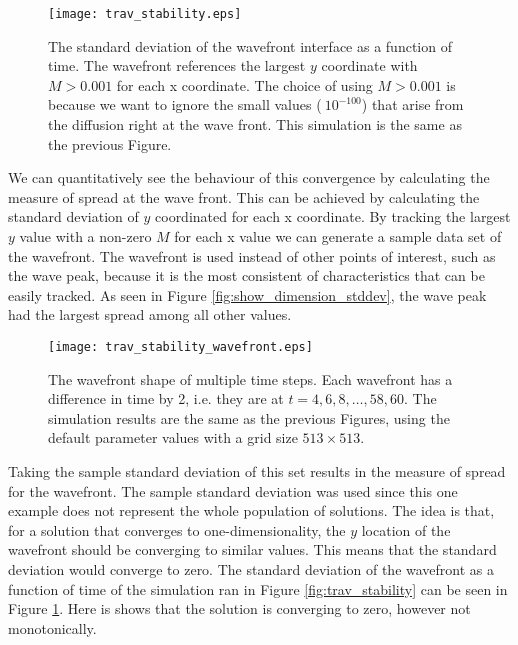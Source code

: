 \begin{figure}[!htp]
  \centering
  \texttt{[image: trav\_stability.eps]}
  \caption{The standard deviation of the wavefront interface as a function of time.
    The wavefront references the largest $y$ coordinate with $M > 0.001$ for each x coordinate.
    The choice of using $M > 0.001$ is because we want to ignore the small values ($~10^{-100}$) that arise from the diffusion right at the wave front. 
    This simulation is the same as the previous Figure.  }
  \label{fig:trav_stability_stddev}
\end{figure}

We can quantitatively see the behaviour of this convergence by calculating the measure of spread at the wave front.
This can be achieved by calculating the standard deviation of $y$ coordinated for each x coordinate.
By tracking the largest $y$ value with a non-zero $M$ for each x value we can generate a sample data set of the wavefront.
The wavefront is used instead of other points of interest, such as the wave peak, because it is the most consistent of characteristics that can be easily tracked.
As seen in Figure \ref{fig:show_dimension_stddev}, the wave peak had the largest spread among all other values. 

\begin{figure}[!htp]
  \centering
  \texttt{[image: trav\_stability\_wavefront.eps]}
  \caption{The wavefront shape of multiple time steps.
    Each wavefront has a difference in time by 2, i.e. they are at $t = 4, 6, 8, \ldots, 58, 60$. 
    The simulation results are the same as the previous Figures, using the default parameter values with a grid size $513 \times 513$.
    }
  \label{fig:trav_wavefront}
\end{figure}

Taking the sample standard deviation of this set results in the measure of spread for the wavefront.
The sample standard deviation was used since this one example does not represent the whole population of solutions.
The idea is that, for a solution that converges to one-dimensionality, the $y$ location of the wavefront should be converging to similar values.
This means that the standard deviation would converge to zero.
The standard deviation of the wavefront as a function of time of the simulation ran in Figure \ref{fig:trav_stability} can be seen in Figure \ref{fig:trav_stability_stddev}.
Here is shows that the solution is converging to zero, however not monotonically.

